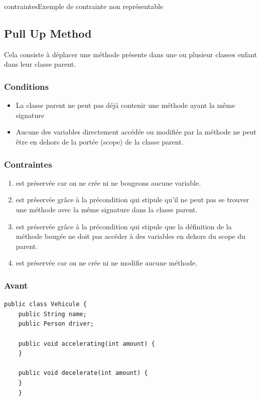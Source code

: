 \documentclass[a4paper, 12pt]{article}
\begin{document}
\begin{figu}{contraintes}{Exemple de contrainte non représentable}
  \subsection{Pull Up Method}

  Cela consiste à déplacer une méthode présente dans une ou plusieur classes enfant dans leur classe parent.

  \subsubsection{Conditions}

  \begin{itemize}[label=\textbullet]
    \item La classe parent ne peut pas déjà contenir une méthode ayant la même signature
    \item Aucune des variables directement accédée ou modifiée par la méthode ne peut être en dehors de la portée (scope) de la classe parent.
  \end{itemize}

  \subsubsection{Contraintes}

  \begin{enumerate}
    \item est préservée car on ne crée ni ne bougeons aucune variable.
    \item est préservée grâce à la précondition qui stipule qu'il ne peut pas se trouver une méthode avec la même signature dans la classe parent.
    \item est préservée grâce à la précondition qui stipule que la définition de la méthode bougée ne doit pas accéder à des variables en dehors du scope du parent.
    \item est préservée car on ne crée ni ne modifie aucune méthode.
  \end{enumerate}

  \subsubsection{Avant}
  \begin{lstlisting}[frame=single]
    public class Vehicule {
    public String name;
    public Person driver;

    public void accelerating(int amount) {
    }

    public void decelerate(int amount) {
    }
    }


\end{lstlisting}
\end{figu}
\end{document}
